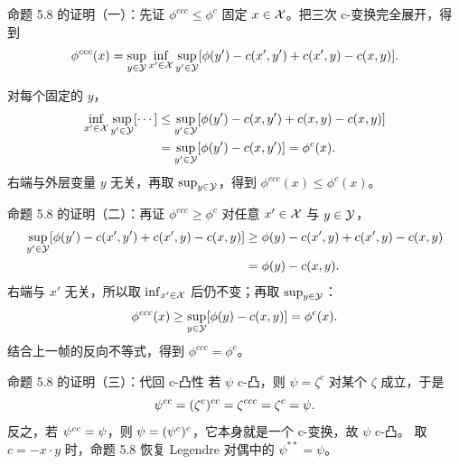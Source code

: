 \begin{frame}{命题 5.8 的证明（一）：先证 $\phi^{ccc}\le\phi^c$}
  固定 $x\in\mathcal{X}$。\proofskipnote 把三次 c-变换完全展开，得到
  \[
    \phi^{ccc}(x)
    = \sup_{y\in\mathcal{Y}}\inf_{x'\in\mathcal{X}}\sup_{y'\in\mathcal{Y}}
    [\phi(y')-c(x',y')+c(x',y)-c(x,y)] .
  \]

  对每个固定的 $y$，
  \[
    \begin{aligned}
      \inf_{x'\in\mathcal{X}}\sup_{y'\in\mathcal{Y}}[\cdots]
      &\le \sup_{y'\in\mathcal{Y}}[\phi(y')-c(x,y')+c(x,y)-c(x,y)]\\
      &= \sup_{y'\in\mathcal{Y}}[\phi(y')-c(x,y')]
       = \phi^c(x).
    \end{aligned}
  \]
  右端与外层变量 $y$ 无关，再取 $\sup_{y\in\mathcal{Y}}$，得到 $\phi^{ccc}(x)\le\phi^c(x)$。

\end{frame}

\begin{frame}{命题 5.8 的证明（二）：再证 $\phi^{ccc}\ge\phi^c$}
  对任意 $x'\in\mathcal{X}$ 与 $y\in\mathcal{Y}$，
  \[
    \begin{aligned}
      \sup_{y'\in\mathcal{Y}}[\phi(y')-c(x',y')+c(x',y)-c(x,y)]
      &\ge \phi(y)-c(x',y)+c(x',y)-c(x,y)\\
      &= \phi(y)-c(x,y).
    \end{aligned}
  \]
  右端与 $x'$ 无关，所以取 $\inf_{x'\in\mathcal{X}}$ 后仍不变；再取 $\sup_{y\in\mathcal{Y}}$：
  \[
    \phi^{ccc}(x)\ge\sup_{y\in\mathcal{Y}}[\phi(y)-c(x,y)]=\phi^c(x).
  \]
  结合上一帧的反向不等式，得到 $\phi^{ccc}=\phi^c$。\proofskipnote

\end{frame}

\begin{frame}{命题 5.8 的证明（三）：代回 c-凸性}
  若 $\psi$ c-凸，则 $\psi=\zeta^c$ 对某个 $\zeta$ 成立，于是
  \[
    {\psi}^{cc}=(\zeta^c)^{cc}=\zeta^{ccc}=\zeta^c=\psi .
  \]
  反之，若 ${\psi}^{cc}=\psi$，则 $\psi=({\psi}^{c})^c$，它本身就是一个 c-变换，故 $\psi$ c-凸。\proofskipnote
   取 $c=-x\cdot y$ 时，命题 5.8 恢复 Legendre 对偶中的 $\psi^{**}=\psi$。

\end{frame}

